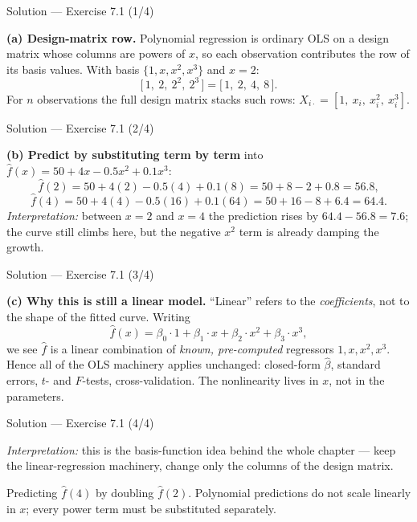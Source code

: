 \documentclass[aspectratio=169,11pt]{beamer}
\begin{document}
\begin{frame}{Solution --- Exercise 7.1 (1/4)}
\begin{solutionbox}
\textbf{(a) Design-matrix row.} Polynomial regression is ordinary OLS on a design matrix whose columns are powers of $x$, so each observation contributes the row of its basis values. With basis $\{1,x,x^2,x^3\}$ and $x=2$:
\[ \big[\,1,\ 2,\ 2^2,\ 2^3\,\big]=\big[\,1,\ 2,\ 4,\ 8\,\big]. \]
For $n$ observations the full design matrix stacks such rows: $X_{i\cdot}=[1,\ x_i,\ x_i^2,\ x_i^3]$.
\end{solutionbox}
\end{frame}

\begin{frame}{Solution --- Exercise 7.1 (2/4)}
\begin{solutionbox}
\medskip
\textbf{(b) Predict by substituting term by term} into $\hat f(x)=50+4x-0.5x^2+0.1x^3$:
\[ \hat f(2)=50+4(2)-0.5(4)+0.1(8)=50+8-2+0.8=56.8, \]
\[ \hat f(4)=50+4(4)-0.5(16)+0.1(64)=50+16-8+6.4=64.4. \]
\emph{Interpretation:} between $x=2$ and $x=4$ the prediction rises by $64.4-56.8=7.6$; the curve still climbs here, but the negative $x^2$ term is already damping the growth.
\end{solutionbox}
\end{frame}

\begin{frame}{Solution --- Exercise 7.1 (3/4)}
\begin{solutionbox}
\textbf{(c) Why this is still a linear model.} ``Linear'' refers to the \emph{coefficients}, not to the shape of the fitted curve. Writing
\[ \hat f(x)=\beta_0\cdot 1+\beta_1\cdot x+\beta_2\cdot x^2+\beta_3\cdot x^3, \]
we see $\hat f$ is a linear combination of \emph{known, pre-computed} regressors $1,x,x^2,x^3$. Hence all of the OLS machinery applies unchanged: closed-form $\hat\beta$, standard errors, $t$- and $F$-tests, cross-validation. The nonlinearity lives in $x$, not in the parameters.
\end{solutionbox}
\end{frame}

\begin{frame}{Solution --- Exercise 7.1 (4/4)}
\begin{solutionbox}
\medskip
\emph{Interpretation:} this is the basis-function idea behind the whole chapter --- keep the linear-regression machinery, change only the columns of the design matrix.
\end{solutionbox}
\begin{mistake}
Predicting $\hat f(4)$ by doubling $\hat f(2)$. Polynomial predictions do not scale linearly in $x$; every power term must be substituted separately.
\end{mistake}
\end{frame}
\end{document}
